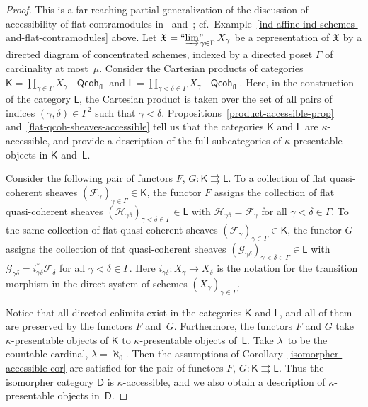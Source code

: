 \documentclass[12pt,a4paper]{amsart}
\newcommand{\+}{\protect\nobreakdash-}
\renewcommand{\:}{\colon}
\newcommand{\rarrow}{\longrightarrow}
\newcommand{\Qcoh}{{\operatorname{\mathsf{--Qcoh}}}}
\newcommand{\fl}{\mathsf{fl}}
\newcommand{\ilim}
 {\mathop{\text{\normalfont``$\varinjlim$''\!\!}}\nolimits}
\newcommand{\sD}{\mathsf D}
\newcommand{\sK}{\mathsf K}
\newcommand{\sL}{\mathsf L}
\newcommand{\cF}{\mathcal F}
\newcommand{\cG}{\mathcal G}
\newcommand{\cH}{\mathcal H}
\newcommand{\fX}{\mathfrak X}
\theoremstyle{plain}
\theoremstyle{definition}
\begin{document}
\begin{proof}
 This is a far-reaching partial generalization of the discussion of
accessibility of flat contramodules in~\cite[Corollary~7.5]{PR}
and~\cite[Theorem~10.1]{Pflcc}; cf.\
Example~\ref{ind-affine-ind-schemes-and-flat-contramodules} above.
 Let $\fX=\ilim_{\gamma\in\Gamma}X_\gamma$ be a representation of $\fX$
by a directed diagram of concentrated schemes, indexed by a directed
poset $\Gamma$ of cardinality at most~$\mu$.
 Consider the Cartesian products of categories
$\sK=\prod_{\gamma\in\Gamma}X_\gamma\Qcoh_\fl$ and
$\sL=\prod_{\gamma<\delta\in\Gamma}X_\gamma\Qcoh_\fl$.
 Here, in the construction of the category $\sL$, the Cartesian
product is taken over the set of all pairs of indices
$(\gamma,\delta)\in\Gamma^2$ such that $\gamma<\delta$.
 Propositions~\ref{product-accessible-prop}
and~\ref{flat-qcoh-sheaves-accessible} tell us that the categories
$\sK$ and $\sL$ are $\kappa$\+accessible, and provide a description
of the full subcategories of $\kappa$\+presentable objects in $\sK$
and~$\sL$.

 Consider the following pair of functors
$F$, $G\:\sK\rightrightarrows\sL$.
 To a collection of flat quasi-coherent sheaves
$(\cF_\gamma)_{\gamma\in\Gamma}\in\sK$, the functor $F$ assigns
the collection of flat quasi-coherent sheaves
$(\cH_{\gamma\delta})_{\gamma<\delta\in\Gamma}\in\sL$ with
$\cH_{\gamma\delta}=\cF_\gamma$ for all $\gamma<\delta\in\Gamma$.
 To the same collection of flat quasi-coherent sheaves
$(\cF_\gamma)_{\gamma\in\Gamma}\in\sK$, the functor $G$ assigns
the collection of flat quasi-coherent sheaves
$(\cG_{\gamma\delta})_{\gamma<\delta\in\Gamma}\in\sL$ with
$\cG_{\gamma\delta}=i_{\gamma\delta}^*\cF_\delta$
for all $\gamma<\delta\in\Gamma$.
 Here $i_{\gamma\delta}\:X_\gamma\rarrow X_\delta$ is the notation
for the transition morphism in the direct system of schemes
$(X_\gamma)_{\gamma\in\Gamma}$.

 Notice that all directed colimits exist in the categories $\sK$
and $\sL$, and all of them are preserved by the functors $F$ and~$G$.
 Furthermore, the functors $F$ and $G$ take $\kappa$\+presentable
objects of $\sK$ to $\kappa$\+presentable objects of~$\sL$.
 Take $\lambda$~to be the countable cardinal, $\lambda=\aleph_0$.
 Then the assumptions of Corollary~\ref{isomorpher-accessible-cor} are
satisfied for the pair of functors $F$, $G\:\sK\rightrightarrows\sL$.
 Thus the isomorpher category $\sD$ is $\kappa$\+accessible, and
we also obtain a description of $\kappa$\+presentable objects in~$\sD$.


\end{proof}
\end{document}
